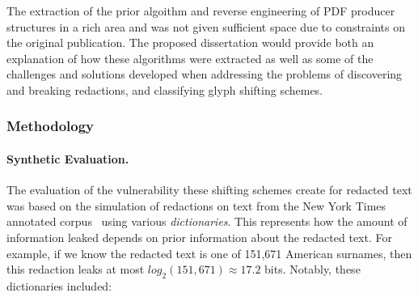 The extraction of the prior algoithm and reverse engineering of PDF producer structures in a rich area and was not given sufficient space due to constraints on the original publication.
The proposed dissertation would provide both an explanation of how these algorithms were extracted as well as some of the challenges and solutions developed when addressing the problems of discovering and breaking redactions, and classifying glyph shifting schemes.

\subsubsection{Methodology}

\paragraph{Synthetic Evaluation.}
The evaluation of the vulnerability these shifting schemes create for redacted text was based on the simulation of redactions on text from the New York Times annotated corpus~\cite{nytCorp} using various \emph{dictionaries}.
This represents how the amount of information leaked depends on prior information about the redacted text. 
For example, if we know the redacted text is one of 151,671 American surnames, then this redaction leaks at most $log_{2}(151, 671) \approx 17.2$ bits. 
Notably, these dictionaries included:



